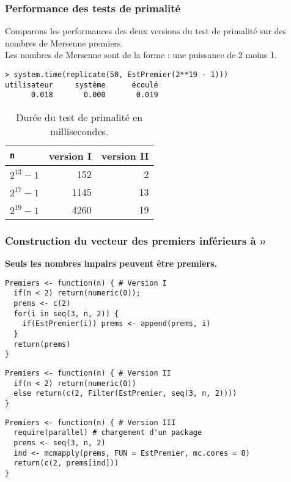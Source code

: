 \documentclass[10pt]{beamer}
\begin{document}
\begin{frame}[fragile]
  \frametitle{Performance des tests de primalité }

  Comparons les performances des deux versions du test de primalité  sur des nombres de Mersenne premiers. \\
  Les nombres de Mersenne sont de la forme : une puissance de 2 moins 1.

  \begin{lstlisting}
> system.time(replicate(50, EstPremier(2**19 - 1)))
utilisateur     système      écoulé 
      0.018       0.000       0.019     
  \end{lstlisting}

  \begin{table}[ht]
    \centering
    \begin{tabular}{l|rr}
      \toprule
      \texttt{n} & version I & version II \\
      \midrule
      $2^{13}-1$ & 152       & 2          \\
      $2^{17}-1$ & 1145      & 13         \\
      $2^{19}-1$ & 4260      & 19         \\
      \bottomrule
    \end{tabular}
    \caption{Durée du test de primalité en millisecondes.}
  \end{table}

\end{frame}


\begin{frame}[fragile]
  \frametitle{Construction du vecteur des premiers inférieurs à $n$ }

  \textbf{Seuls les nombres impairs peuvent être premiers.}

\begin{lstlisting}[style=editor]
Premiers <- function(n) { # Version I
  if(n < 2) return(numeric(0));
  prems <- c(2)
  for(i in seq(3, n, 2)) {
    if(EstPremier(i)) prems <- append(prems, i)
  }
  return(prems)
}    
\end{lstlisting}


\begin{lstlisting}[style=editor]
Premiers <- function(n) { # Version II
  if(n < 2) return(numeric(0))
  else return(c(2, Filter(EstPremier, seq(3, n, 2))))
}    
\end{lstlisting}


\begin{lstlisting}[style=editor]
Premiers <- function(n) { # Version III
  require(parallel) # chargement d'un package
  prems <- seq(3, n, 2)
  ind <- mcmapply(prems, FUN = EstPremier, mc.cores = 8)
  return(c(2, prems[ind]))
}  
\end{lstlisting}

\end{frame}
\end{document}
